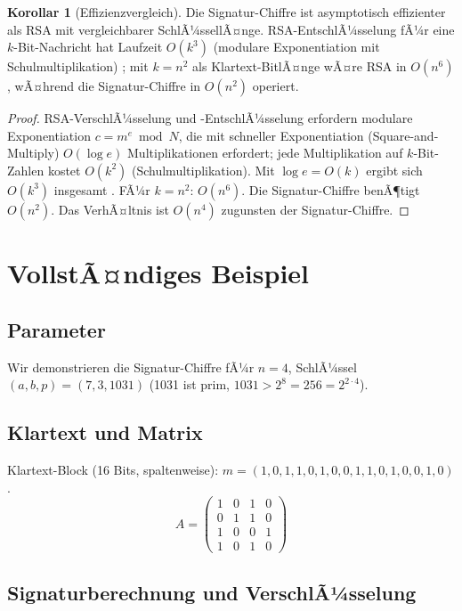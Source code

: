 ﻿\documentclass[a4paper,12pt]{scrreprt}
\theoremstyle{definition}
\newtheorem{korollar}{Korollar}[section]
\begin{document}
\begin{korollar}[Effizienzvergleich]
	\label{kor:effizienz}
	Die Signatur-Chiffre ist asymptotisch effizienter als RSA mit vergleichbarer SchlÃ¼ssellÃ¤nge. RSA-EntschlÃ¼sselung fÃ¼r eine $k$-Bit-Nachricht hat Laufzeit $O(k^3)$ (modulare Exponentiation mit Schulmultiplikation) \cite{Riv78}; mit $k = n^2$ als Klartext-BitlÃ¤nge wÃ¤re RSA in $O(n^6)$, wÃ¤hrend die Signatur-Chiffre in $O(n^2)$ operiert.
\end{korollar}

\begin{proof}
	RSA-VerschlÃ¼sselung und -EntschlÃ¼sselung erfordern modulare Exponentiation $c = m^e \bmod N$, die mit schneller Exponentiation (Square-and-Multiply) $O(\log e)$ Multiplikationen erfordert; jede Multiplikation auf $k$-Bit-Zahlen kostet $O(k^2)$ (Schulmultiplikation). Mit $\log e = O(k)$ ergibt sich $O(k^3)$ insgesamt \cite{MvOV96}. FÃ¼r $k = n^2$: $O(n^6)$. Die Signatur-Chiffre benÃ¶tigt $O(n^2)$. Das VerhÃ¤ltnis ist $O(n^4)$ zugunsten der Signatur-Chiffre.
\end{proof}

\section{VollstÃ¤ndiges Beispiel}

\subsection{Parameter}

Wir demonstrieren die Signatur-Chiffre fÃ¼r $n = 4$, SchlÃ¼ssel $(a, b, p) = (7, 3, 1031)$ (1031 ist prim, $1031 > 2^8 = 256 = 2^{2 \cdot 4}$).

\subsection{Klartext und Matrix}

Klartext-Block (16 Bits, spaltenweise): $m = (1,0,1,1, 0,1,0,0, 1,1,0,1, 0,0,1,0)$.
\[
A = \begin{pmatrix} 1 & 0 & 1 & 0 \\ 0 & 1 & 1 & 0 \\ 1 & 0 & 0 & 1 \\ 1 & 0 & 1 & 0 \end{pmatrix}
\]

\subsection{Signaturberechnung und VerschlÃ¼sselung}
\end{document}
